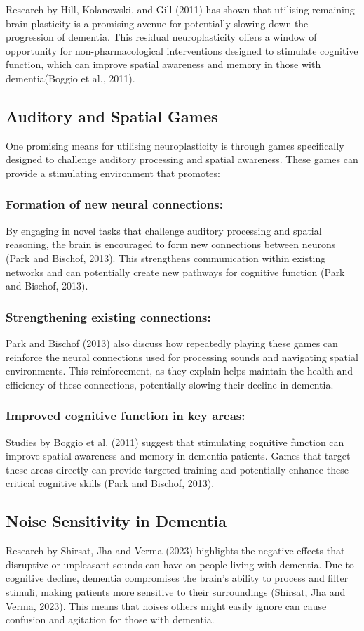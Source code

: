 \documentclass{l4proj}
\begin{document}
Research by Hill, Kolanowski, and Gill (2011) has shown that utilising remaining brain plasticity is a promising avenue for potentially slowing down the progression of dementia. This residual neuroplasticity offers a window of opportunity for non-pharmacological interventions designed to stimulate cognitive function, which can improve spatial awareness and memory in those with dementia(Boggio et al., 2011).

\subsection{Auditory and Spatial Games}
One promising means for utilising neuroplasticity is through games specifically designed to challenge auditory processing and spatial awareness. These games can provide a stimulating environment that promotes:

\subsubsection{Formation of new neural connections:} By engaging in novel tasks that challenge auditory processing and spatial reasoning, the brain is encouraged to form new connections between neurons (Park and Bischof, 2013). This strengthens communication within existing networks and can potentially create new pathways for cognitive function (Park and Bischof, 2013).

\subsubsection{Strengthening existing connections:} Park and Bischof (2013) also discuss how repeatedly playing these games can reinforce the neural connections used for processing sounds and navigating spatial environments. This reinforcement, as they explain helps maintain the health and efficiency of these connections, potentially slowing their decline in dementia.

\subsubsection{Improved cognitive function in key areas:} Studies by Boggio et al. (2011) suggest that stimulating cognitive function can improve spatial awareness and memory in dementia patients. Games that target these areas directly can provide targeted training and potentially enhance these critical cognitive skills (Park and Bischof, 2013).

\subsection{Noise Sensitivity in Dementia}\label{sec:noise_sensitivity}
Research by Shirsat, Jha and Verma (2023) highlights the negative effects that disruptive or unpleasant sounds can have on people living with dementia. Due to cognitive decline, dementia compromises the brain's ability to process and filter stimuli, making patients more sensitive to their surroundings (Shirsat, Jha and Verma, 2023). This means that noises others might easily ignore can cause confusion and agitation for those with dementia.
\end{document}
